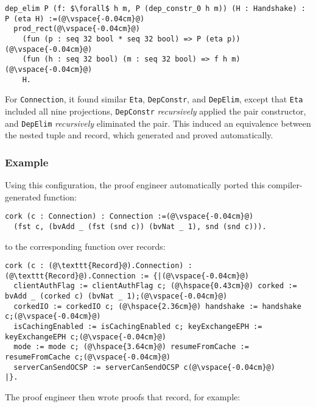 \begin{lstlisting}[backgroundcolor=\color{cyan!30}]
dep_elim P (f: $\forall$ h m, P (dep_constr_0 h m)) (H : Handshake) : P (eta H) :=(@\vspace{-0.04cm}@)
  prod_rect(@\vspace{-0.04cm}@)
    (fun (p : seq 32 bool * seq 32 bool) => P (eta p))(@\vspace{-0.04cm}@)
    (fun (h : seq 32 bool) (m : seq 32 bool) => f h m)(@\vspace{-0.04cm}@)
    H.
\end{lstlisting}
For \lstinline{Connection}, it found similar \lstinline{Eta}, \lstinline{DepConstr}, and \lstinline{DepElim},
except that \lstinline{Eta} included all nine projections, \lstinline{DepConstr} \textit{recursively} applied the
pair constructor, and \lstinline{DepElim} \textit{recursively} eliminated the pair.
This induced an equivalence between the nested tuple and record,
which \toolname generated and proved automatically.

\subsubsection{Example}
Using this configuration, the proof engineer automatically ported this compiler-generated function:

\begin{lstlisting}
cork (c : Connection) : Connection :=(@\vspace{-0.04cm}@)
  (fst c, (bvAdd _ (fst (snd c)) (bvNat _ 1), snd (snd c))).
\end{lstlisting}
to the corresponding function over records:

\begin{lstlisting}[backgroundcolor=\color{cyan!30}]
cork (c : (@\texttt{Record}@).Connection) : (@\texttt{Record}@).Connection := {|(@\vspace{-0.04cm}@)
  clientAuthFlag := clientAuthFlag c; (@\hspace{0.43cm}@) corked := bvAdd _ (corked c) (bvNat _ 1);(@\vspace{-0.04cm}@)
  corkedIO := corkedIO c; (@\hspace{2.36cm}@) handshake := handshake c;(@\vspace{-0.04cm}@)
  isCachingEnabled := isCachingEnabled c; keyExchangeEPH := keyExchangeEPH c;(@\vspace{-0.04cm}@)
  mode := mode c; (@\hspace{3.64cm}@) resumeFromCache := resumeFromCache c;(@\vspace{-0.04cm}@)
  serverCanSendOCSP := serverCanSendOCSP c(@\vspace{-0.04cm}@)
|}.
\end{lstlisting}
The proof engineer then wrote proofs that record, for example:

